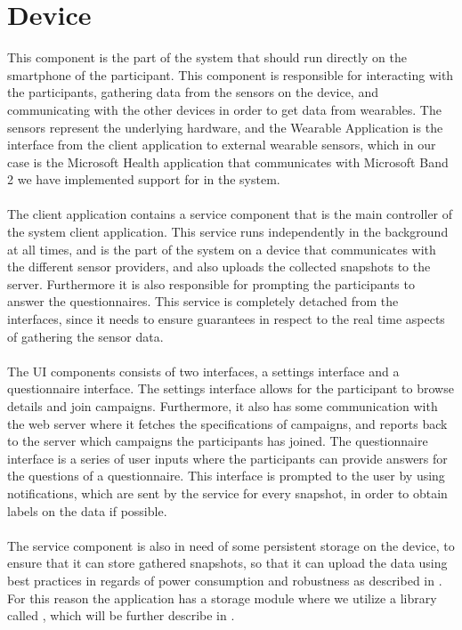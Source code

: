 
\section{Device}
\label{sec:device}
This component is the part of the system that should run directly on the smartphone of the participant. This component is responsible for interacting with the participants, gathering data from the sensors on the device, and communicating with the other devices in order to get data from wearables. The sensors represent the underlying hardware, and the Wearable Application is the interface from the client application to external wearable sensors, which in our case is the Microsoft Health application that communicates with Microsoft Band 2 we have implemented support for in the system.
\\\\
The client application contains a service component that is the main controller of the system client application. This service runs independently in the background at all times, and is the part of the system on a device that communicates with the different sensor providers, and also uploads the collected snapshots to the server. Furthermore it is also responsible for prompting the participants to answer the questionnaires. This service is completely detached from the interfaces, since it needs to ensure guarantees in respect to the real time aspects of gathering the sensor data.
\\\\
The UI components consists of two interfaces, a settings interface and a questionnaire interface. The settings interface allows for the participant to browse details and join campaigns. Furthermore, it also has some communication with the web server where it fetches the specifications of campaigns, and reports back to the server which campaigns the participants has joined. The questionnaire interface is a series of user inputs where the participants can provide answers for the questions of a questionnaire. This interface is prompted to the user by using notifications, which are sent by the service for every snapshot, in order to obtain labels on the data if possible.
\\\\
The service component is also in need of some persistent storage on the device, to ensure that it can store gathered snapshots, so that it can upload the data using best practices in regards of power consumption and robustness as described in . For this reason the application has a storage module where we utilize a library called , which will be further describe in .
